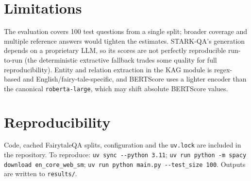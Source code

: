 \documentclass[11pt]{article}
\begin{document}
\section*{Limitations}
The evaluation covers 100 test questions from a single split; broader coverage
and multiple reference answers would tighten the estimates. STARK-QA's
generation depends on a proprietary LLM, so its scores are not perfectly
reproducible run-to-run (the deterministic extractive fallback trades some
quality for full reproducibility). Entity and relation extraction in the KAG
module is regex-based and English/fairy-tale-specific, and BERTScore uses a
lighter encoder than the canonical \texttt{roberta-large}, which may shift
absolute BERTScore values.

\section*{Reproducibility}
Code, cached FairytaleQA splits, configuration and the \texttt{uv.lock} are
included in the repository. To reproduce:
\texttt{uv sync -{}-python 3.11}; \texttt{uv run python -m spacy download
en\_core\_web\_sm}; \texttt{uv run python main.py -{}-test\_size 100}. Outputs are
written to \texttt{results/}.


\end{document}
